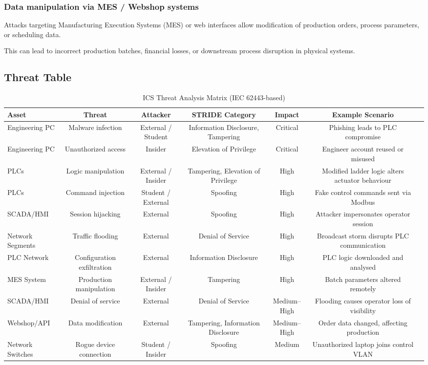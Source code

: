 \subsubsection{Data manipulation via MES / Webshop systems}
Attacks targeting Manufacturing Execution Systems (MES) or web interfaces allow modification of production orders, process parameters, or scheduling data.

This can lead to incorrect production batches, financial losses, or downstream process disruption in physical systems.

\subsection{Threat Table}

\begin{table}[h!]
\centering
\begin{adjustbox}{max width=\textwidth}
\begin{tabular}{@{}lcccccl@{}}
\toprule
\textbf{Asset} & \textbf{Threat} & \textbf{Attacker} & \textbf{STRIDE Category} & \textbf{Impact} & \textbf{Example Scenario} \\
\midrule
Engineering PC & Malware infection & External / Student & Information Disclosure, Tampering & Critical & Phishing leads to PLC compromise \\
Engineering PC & Unauthorized access & Insider & Elevation of Privilege & Critical & Engineer account reused or misused \\
PLCs & Logic manipulation & External / Insider & Tampering, Elevation of Privilege & High & Modified ladder logic alters actuator behaviour \\
PLCs & Command injection & Student / External & Spoofing & High & Fake control commands sent via Modbus \\
SCADA/HMI & Session hijacking & External & Spoofing & High & Attacker impersonates operator session \\
Network Segments & Traffic flooding & External & Denial of Service & High & Broadcast storm disrupts PLC communication \\
PLC Network & Configuration exfiltration & External & Information Disclosure & High & PLC logic downloaded and analysed \\
MES System & Production manipulation & External / Insider & Tampering & High & Batch parameters altered remotely \\
SCADA/HMI & Denial of service & External & Denial of Service & Medium–High & Flooding causes operator loss of visibility \\
Webshop/API & Data modification & External & Tampering, Information Disclosure & Medium–High & Order data changed, affecting production \\
Network Switches & Rogue device connection & Student / Insider & Spoofing & Medium & Unauthorized laptop joins control VLAN \\
\bottomrule
\end{tabular}
\end{adjustbox}
\caption{ICS Threat Analysis Matrix (IEC 62443-based)}
\end{table}


